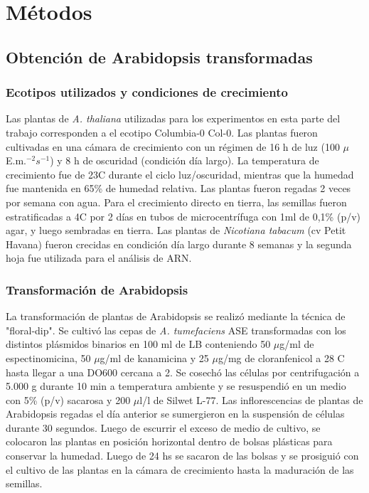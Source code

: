 \graphicspath{{Materials/Figs/}}

\chapter{Métodos} 

\section{Obtención de Arabidopsis transformadas}

\subsection{Ecotipos utilizados y condiciones de crecimiento}
Las plantas de  \textit{A. thaliana} utilizadas para los experimentos en esta parte del trabajo corresponden a el ecotipo Columbia-0 Col-0.
Las plantas fueron cultivadas en una cámara de crecimiento con un régimen de 16 h de luz (100 $\mu$E.m.$^{-2}s^{-1}$) y 8 h de oscuridad (condición día largo).
La temperatura de crecimiento fue de 23\degree C durante el ciclo luz/oscuridad, mientras que la humedad fue mantenida en 65\% de humedad relativa.
Las plantas fueron regadas 2 veces por semana con agua.
Para el crecimiento directo en tierra, las semillas fueron estratificadas a 4\degree C por 2 días en tubos de microcentrífuga con 1ml de 0,1\% (p/v) agar, y luego sembradas en tierra.
Las plantas de \textit{Nicotiana tabacum} (cv Petit Havana) fueron crecidas en condición día largo durante 8 semanas y la segunda hoja fue utilizada para el análisis de ARN.

\subsection{Transformación de Arabidopsis}

La transformación de plantas de Arabidopsis se realizó mediante la técnica de "floral-dip".
Se cultivó las cepas de \textit{A. tumefaciens} ASE transformadas con los distintos plásmidos binarios en 100 ml de LB conteniendo 50 $\mu$g/ml de espectinomicina, 50 $\mu$g/ml de kanamicina y 25 $\mu$g/mg de cloranfenicol a 28 \degree C hasta llegar a una DO600 cercana a 2.
Se cosechó las células por centrifugación a 5.000 g durante 10 min a temperatura ambiente y se resuspendió en un medio con 5\% (p/v) sacarosa y 200 $\mu$l/l de Silwet L-77.
Las inflorescencias de plantas de Arabidopsis regadas el día anterior se sumergieron en la suspensión de células durante 30 segundos.
Luego de escurrir el exceso de medio de cultivo, se colocaron las plantas en posición horizontal dentro de bolsas plásticas para conservar la humedad.
Luego de 24 hs se sacaron de las bolsas y se prosiguió con el cultivo de las plantas en la cámara de crecimiento hasta la maduración de las semillas.


